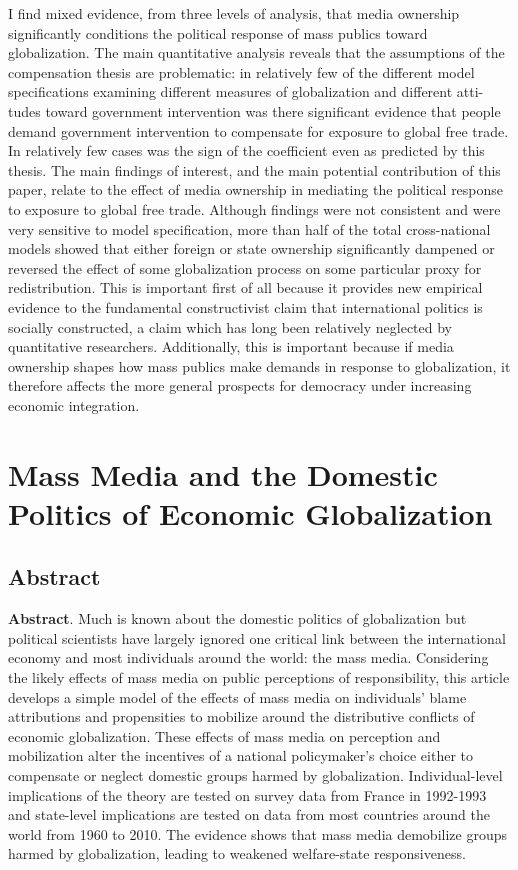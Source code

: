 \documentclass[12pt]{report}
\begin{document}
I find mixed evidence, from three levels of analysis, that media ownership significantly conditions
the political response of mass publics toward globalization. The main quantitative analysis reveals
that the assumptions of the compensation thesis are problematic: in relatively few of the different
model specifications examining different measures of globalization and different atti- tudes toward
government intervention was there significant evidence that people demand government intervention to
compensate for exposure to global free trade. In relatively few cases was the sign of the
coefficient even as predicted by this thesis. The main findings of interest, and the main potential
contribution of this paper, relate to the effect of media ownership in mediating the political
response to exposure to global free trade. Although findings were not consistent and were very
sensitive to model specification, more than half of the total cross-national models showed that
either foreign or state ownership significantly dampened or reversed the effect of some
globalization process on some particular proxy for redistribution. This is important first of all because it provides new empirical evidence to the fundamental constructivist claim that international politics is socially constructed, a claim which has long been relatively neglected by quantitative researchers. Additionally, this is important because if media ownership shapes how mass publics make demands in response to globalization, it therefore affects the more general prospects for democracy under increasing economic integration.

\chapter{Mass Media and the Domestic Politics of Economic Globalization}

\section{Abstract}

\textbf{Abstract}. Much is known about the domestic politics of globalization but political scientists
have largely ignored one critical link between the international economy and most individuals around
the world: the mass media. Considering the likely effects of mass media on public perceptions of
responsibility, this article develops a simple model of the effects of mass media on individuals'
blame attributions and propensities to mobilize around the distributive conflicts of economic
globalization. These effects of mass media on perception and mobilization alter the incentives of a
national policymaker's choice either to compensate or neglect domestic groups harmed by
globalization. Individual-level implications of the theory are tested on survey data from France in
1992-1993 and state-level implications are tested on data from most countries around the world from
1960 to 2010. The evidence shows that mass media demobilize groups harmed by globalization, leading
to weakened welfare-state responsiveness.
\end{document}
